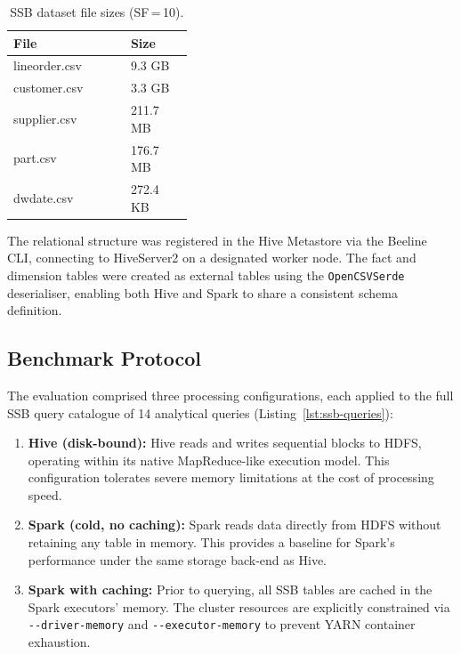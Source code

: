 
\begin{table}[htbp]
  \centering
  \caption{SSB dataset file sizes (SF\,=\,10).}
  \label{tab:ssb-dataset-sizes}
  \renewcommand{\arraystretch}{1.2}
  \begin{tabular}{ p{0.25\linewidth} p{0.15\linewidth} }
    \hline
    \textbf{File} & \textbf{Size} \\
    \hline
    lineorder.csv & 9.3 GB \\
    \hline
    customer.csv  & 3.3 GB \\
    \hline
    supplier.csv  & 211.7 MB \\
    \hline
    part.csv      & 176.7 MB \\
    \hline
    dwdate.csv    & 272.4 KB \\
    \hline
  \end{tabular}
\end{table}

The relational structure was registered in the Hive Metastore via the Beeline
CLI, connecting to HiveServer2 on a designated worker node. The fact and
dimension tables were created as external tables using the
\texttt{OpenCSVSerde} deserialiser, enabling both Hive and Spark to share a
consistent schema definition.

\subsection{Benchmark Protocol}

The evaluation comprised three processing configurations, each applied to the
full SSB query catalogue of 14 analytical queries (Listing~\ref{lst:ssb-queries}):

\begin{enumerate}
    \item \textbf{Hive (disk-bound):} Hive reads and writes sequential blocks
    to HDFS, operating within its native MapReduce-like execution model. This
    configuration tolerates severe memory limitations at the cost of processing
    speed.
    \item \textbf{Spark (cold, no caching):} Spark reads data directly from
    HDFS without retaining any table in memory. This provides a baseline for
    Spark's performance under the same storage back-end as Hive.
    \item \textbf{Spark with caching:} Prior to querying, all SSB tables are
    cached in the Spark executors' memory. The cluster resources are explicitly
    constrained via \texttt{-{}-driver-memory} and \texttt{-{}-executor-memory}
    to prevent YARN container exhaustion.
\end{enumerate}

